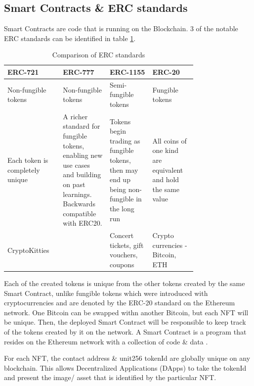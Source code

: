 \documentclass[conference]{IEEEtran}
\begin{document}
\subsection{Smart Contracts \& ERC standards}

Smart Contracts are code that is running on the Blockchain. 3 of the notable ERC standards can be identified in table \ref{tab:erc-comparison}.


\begin{table}[htbp]
\caption{Comparison of ERC standards}
\begin{center}
\begin{tabular}{|p{0.19\linewidth}|p{0.19\linewidth}|p{0.19\linewidth}|p{0.19\linewidth}|}
\hline
\textbf{ERC-721} & \textbf{ERC-777} & \textbf{ERC-1155} & \textbf{ERC-20} \\ 
\hline
Non-fungible tokens & Non-fungible tokens \autocite{dafflon_eip-777_2017} & Semi-fungible tokens \autocite{prathap_semi-fungible_2021} & Fungible tokens \\ 
\hline
Each token is completely unique & A richer standard for fungible tokens, enabling new use cases and building on past learnings. Backwards compatible with ERC20. & Tokens begin trading as fungible tokens, then may end up being non-fungible in the long run & All coins of one kind are equivalent and hold the same value \\ 
\hline
CryptoKitties \autocite{cryptokitties_cryptokitties_nodate} &  & Concert tickets, gift vouchers, coupons & Crypto currencies - Bitcoin, ETH \\
\hline
\end{tabular}
\label{tab:erc-comparison}
\end{center}
\end{table}

\bigbreak
Each of the created tokens is unique from the other tokens created by the same Smart Contract, unlike fungible tokens which were introduced with cryptocurrencies and are denoted by the ERC-20 standard \autocite{noauthor_erc-20_nodate} on the Ethereum network. One Bitcoin can be swapped withn another Bitcoin, but each NFT will be unique.
Then, the deployed Smart Contract will be responsible to keep track of the tokens created by it on the network. A Smart Contract is a program that resides on the Ethereum network with a collection of code \& data \autocite{noauthor_introduction_nodate}.

For each NFT, the contact address \& unit256 tokenId are globally unique on any blockchain. This allows Decentralized Applications (DApps) \autocite{frankenfield_decentralized_nodate, noauthor_decentralized_2021} to take the tokenId and present the image/ asset that is identified by the particular NFT.
\end{document}
